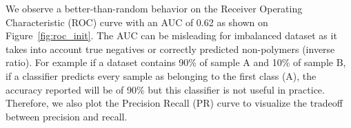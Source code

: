 We observe a better-than-random behavior on the Receiver Operating Characteristic (ROC) curve with an AUC of 0.62 as shown on 
Figure~\ref{fig:roc_init}. %
The AUC can be misleading for imbalanced dataset as it takes into account true negatives or correctly predicted non-polymers (inverse ratio).
For example if a dataset contains 90\% of sample A and 10\% of sample B, if a classifier predicts every sample as belonging to the first class (A), the accuracy reported will be of 90\% but this classifier is not useful in practice.
Therefore, we also plot the Precision Recall (PR) curve to visualize the tradeoff between precision and recall.%
